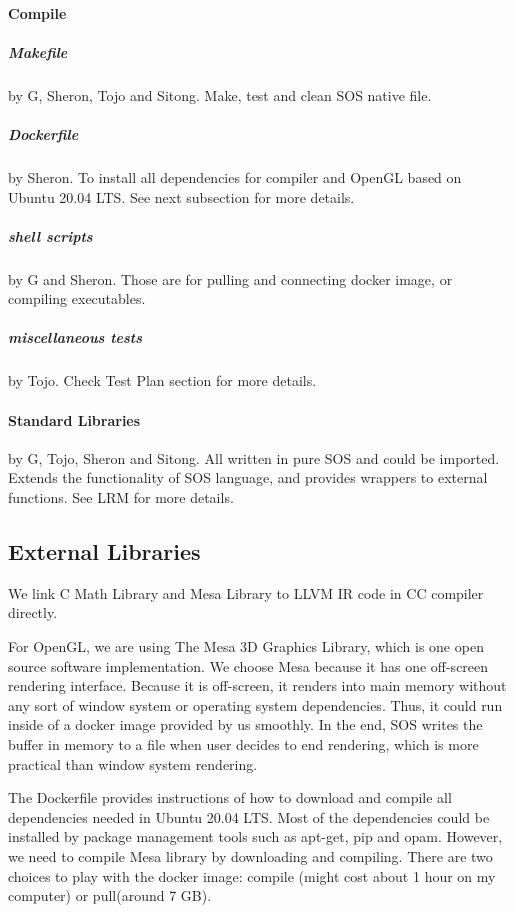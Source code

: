 \documentclass[main.tex]{subfiles}
\begin{document}
    \paragraph{Compile}
        \subparagraph{Makefile} by G, Sheron, Tojo and Sitong. Make, test and clean SOS native file.
        \subparagraph{Dockerfile} by Sheron. To install all dependencies for compiler and OpenGL based on Ubuntu 20.04 LTS. See next subsection for more details.
        \subparagraph{shell scripts} by G and Sheron. Those are for pulling and connecting docker image, or compiling executables.
        \subparagraph{miscellaneous tests} by Tojo. Check Test Plan section for more details.
    
    \paragraph{Standard Libraries} by G, Tojo, Sheron and Sitong. All written in pure SOS and could be imported. Extends the functionality of SOS language, and provides wrappers to external functions. See LRM for more details.
	
	\subsection{External Libraries}
	
	We link C Math Library and Mesa Library to LLVM IR code in CC compiler directly.
	
	For OpenGL, we are using The Mesa 3D Graphics Library, which is one open source software implementation. We choose Mesa because it has one off-screen rendering interface. Because it is off-screen, it renders into main memory without any sort of window system or operating system dependencies. Thus, it could run inside of a docker image provided by us smoothly. In the end, SOS writes the buffer in memory to a file when user decides to end rendering, which is more practical than window system rendering.
	
	The Dockerfile provides instructions of how to download and compile all dependencies needed in Ubuntu 20.04 LTS. Most of the dependencies could be installed by package management tools such as apt-get, pip and opam. However, we need to compile Mesa library by downloading and compiling. There are two choices to play with the docker image: compile (might cost about 1 hour on my computer) or pull(around 7 GB).
	
\end{document}
